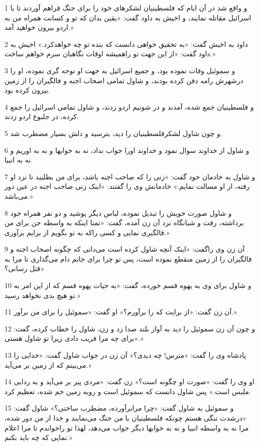 \par 1 و واقع شد در آن ایام که فلسطینیان لشکرهای خود را برای جنگ فراهم آوردند تا با اسرائیل مقاتله نمایند، و اخیش به داود گفت: «یقین بدان که تو و کسانت همراه من به اردو بیرون خواهید آمد.»
\par 2 داود به اخیش گفت: «به تحقیق خواهی دانست که بنده تو چه خواهدکرد.» اخیش به داود گفت: «از این جهت تو راهمیشه اوقات نگاهبان سرم خواهم ساخت.»
\par 3 و سموئیل وفات نموده بود، و جمیع اسرائیل به جهت او نوحه گری نموده، او را درشهرش رامه دفن کرده بودند، و شاول تمامی اصحاب اجنه و فالگیران را از زمین بیرون کرده بود.
\par 4 و فلسطینیان جمع شده، آمدند و در شونیم اردو زدند، و شاول تمامی اسرائیل را جمع کرده، در جلبوع اردو زدند.
\par 5 و چون شاول لشکرفلسطینیان را دید، بترسید و دلش بسیار مضطرب شد. 
\par 6 و شاول از خداوند سوال نمود و خداوند اورا جواب نداد، نه به خوابها و نه به اوریم و نه به انبیا.
\par 7 و شاول به خادمان خود گفت: «زنی را که صاحب اجنه باشد، برای من بطلبید تا نزد او رفته، از او مسالت نمایم.» خادمانش وی را گفتند: «اینک زنی صاحب اجنه در عین دور می‌باشد.»
\par 8 و شاول صورت خویش را تبدیل نموده، لباس دیگر پوشید و دو نفر همراه خود برداشته، رفت و شبانگاه نزد آن زن آمده، گفت: «تمنا اینکه به واسطه جن برای من فالگیری نمایی و کسی راکه به تو بگویم از برایم برآوری.»
\par 9 آن زن وی راگفت: «اینک آنچه شاول کرده است می‌دانی که چگونه اصحاب اجنه و فالگیران را از زمین منقطع نموده است، پس تو چرا برای جانم دام می‌گذاری تا مرا به قتل رسانی؟»
\par 10 و شاول برای وی به یهوه قسم خورده، گفت: «به حیات یهوه قسم که از این امر به تو هیچ بدی نخواهد رسید.»
\par 11 آن زن گفت: «از برایت که را برآورم؟» او گفت: «سموئیل را برای من برآور.»
\par 12 و چون آن زن سموئیل را دید به آواز بلند صدا زد و زن، شاول را خطاب کرده، گفت: «برای چه مرا فریب دادی زیرا تو شاول هستی.»
\par 13 پادشاه وی را گفت: «مترس! چه دیدی؟» آن زن در جواب شاول گفت: «خدایی را می‌بینم که از زمین بر می‌آید.»
\par 14 او وی را گفت: «صورت او چگونه است؟» زن گفت: «مردی پیر بر می‌آید و به ردایی ملبس است.» پس شاول دانست که سموئیل است و روبه زمین خم شده، تعظیم کرد.
\par 15 و سموئیل به شاول گفت: «چرا مرابرآورده، مضطرب ساختی؟» شاول گفت: «درشدت تنگی هستم چونکه فلسطینیان با من جنگ می‌نمایند و خدا از من دور شده، مرا نه به واسطه انبیا و نه به خوابها دیگر جواب می‌دهد، لهذا تو راخواندم تا مرا اعلام نمایی که چه باید بکنم.»
